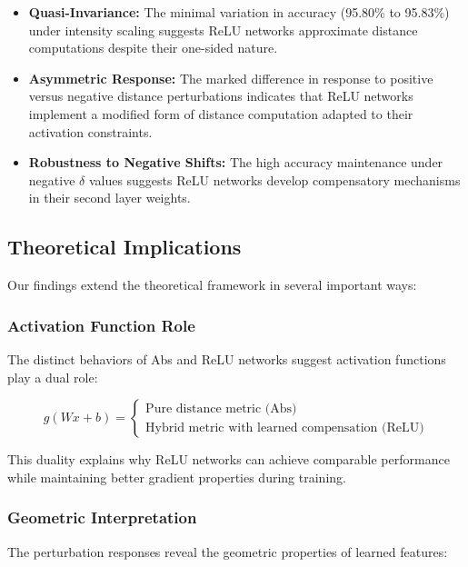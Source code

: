 \begin{itemize}
    \item \textbf{Quasi-Invariance:} The minimal variation in accuracy (95.80\% to 95.83\%) under intensity scaling suggests ReLU networks approximate distance computations despite their one-sided nature.
    
    \item \textbf{Asymmetric Response:} The marked difference in response to positive versus negative distance perturbations indicates that ReLU networks implement a modified form of distance computation adapted to their activation constraints.
    
    \item \textbf{Robustness to Negative Shifts:} The high accuracy maintenance under negative $\delta$ values suggests ReLU networks develop compensatory mechanisms in their second layer weights.
\end{itemize}

\subsection{Theoretical Implications}

Our findings extend the theoretical framework in several important ways:

\subsubsection{Activation Function Role}
The distinct behaviors of Abs and ReLU networks suggest activation functions play a dual role:

\begin{equation}
    g(Wx + b) = \begin{cases}
        \text{Pure distance metric (Abs)} \\
        \text{Hybrid metric with learned compensation (ReLU)}
    \end{cases}
\end{equation}

This duality explains why ReLU networks can achieve comparable performance while maintaining better gradient properties during training.

\subsubsection{Geometric Interpretation}
The perturbation responses reveal the geometric properties of learned features:

